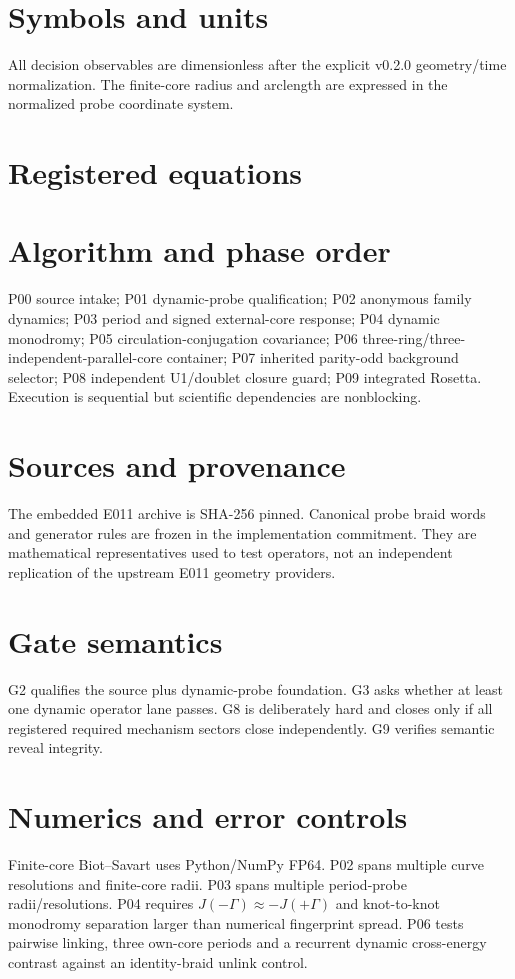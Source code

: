\documentclass[11pt]{article}
\begin{document}
\section{Symbols and units}
All decision observables are dimensionless after the explicit v0.2.0 geometry/time normalization. The finite-core radius and arclength are expressed in the normalized probe coordinate system.

\section{Registered equations}

\section{Algorithm and phase order}
P00 source intake; P01 dynamic-probe qualification; P02 anonymous family dynamics; P03 period and signed external-core response; P04 dynamic monodromy; P05 circulation-conjugation covariance; P06 three-ring/three-independent-parallel-core container; P07 inherited parity-odd background selector; P08 independent U1/doublet closure guard; P09 integrated Rosetta. Execution is sequential but scientific dependencies are nonblocking.

\section{Sources and provenance}
The embedded E011 archive is SHA-256 pinned. Canonical probe braid words and generator rules are frozen in the implementation commitment. They are mathematical representatives used to test operators, not an independent replication of the upstream E011 geometry providers.

\section{Gate semantics}
G2 qualifies the source plus dynamic-probe foundation. G3 asks whether at least one dynamic operator lane passes. G8 is deliberately hard and closes only if all registered required mechanism sectors close independently. G9 verifies semantic reveal integrity.

\section{Numerics and error controls}
Finite-core Biot--Savart uses Python/NumPy FP64. P02 spans multiple curve resolutions and finite-core radii. P03 spans multiple period-probe radii/resolutions. P04 requires $J(-\Gamma)\approx-J(+\Gamma)$ and knot-to-knot monodromy separation larger than numerical fingerprint spread. P06 tests pairwise linking, three own-core periods and a recurrent dynamic cross-energy contrast against an identity-braid unlink control.
\end{document}
